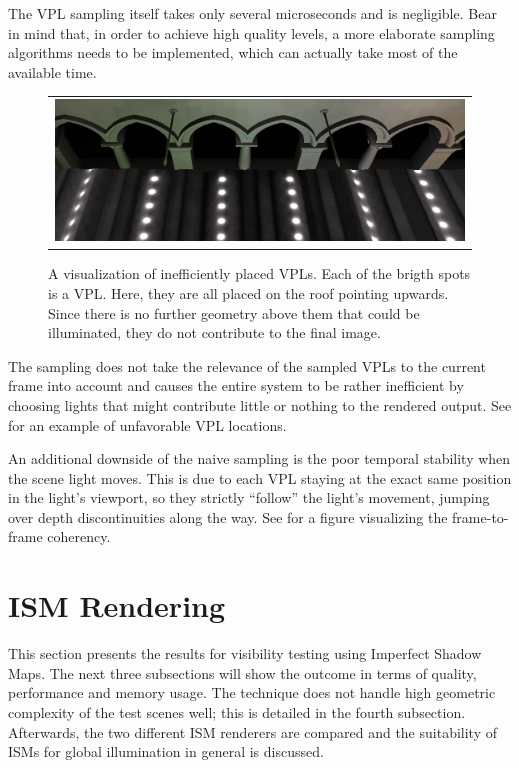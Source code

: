 The VPL sampling itself takes only several microseconds and is negligible. Bear in mind that, in order to achieve high quality levels, a more elaborate sampling algorithms needs to be implemented, which can actually take most of the available time.

\begin{figure}[htb]
\centering
  \begin{tabular}{@{}c@{}}
    \includegraphics[width=1.0\textwidth]{screenshots/RSM_unfavorable} \\
  \end{tabular}
  \caption{A visualization of inefficiently placed VPLs. Each of the brigth spots is a VPL. Here, they are all placed on the roof pointing upwards. Since there is no further geometry above them that could be illuminated, they do not contribute to the final image.}
  \label{fig:results:RSMUnfavorable}
\end{figure}

The sampling does not take the relevance of the sampled VPLs to the current frame into account and causes the entire system to be rather inefficient by choosing lights that might contribute little or nothing to the rendered output. See  for an example of unfavorable VPL locations.

An additional downside of the naive sampling is the poor temporal stability when the scene light moves. This is due to each VPL staying at the exact same position in the light's viewport, so they strictly ``follow'' the light's movement, jumping over depth discontinuities along the way. See  for a figure visualizing the frame-to-frame coherency.



\section{ISM Rendering}

This section presents the results for visibility testing using Imperfect Shadow Maps. The next three subsections will show the outcome in terms of quality, performance and memory usage. The technique does not handle high geometric complexity of the test scenes well; this is detailed in the fourth subsection. Afterwards, the two different ISM renderers are compared and the suitability of ISMs for global illumination in general is discussed.


